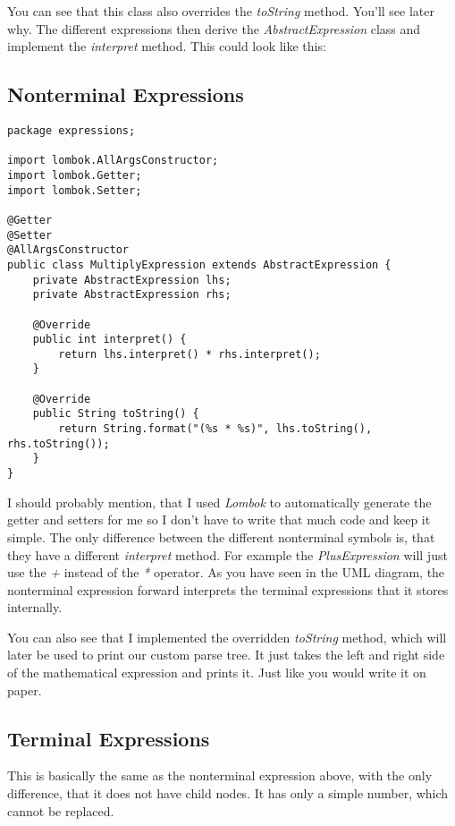 You can see that this class also overrides the \textit{toString} method. You'll see later why. The different expressions then derive the \textit{AbstractExpression} class and implement the \textit{interpret} method. This could look like this: 

\subsection{Nonterminal Expressions}

\begin{verbatim}
package expressions;

import lombok.AllArgsConstructor;
import lombok.Getter;
import lombok.Setter;

@Getter
@Setter
@AllArgsConstructor
public class MultiplyExpression extends AbstractExpression {
    private AbstractExpression lhs;
    private AbstractExpression rhs;

    @Override
    public int interpret() {
        return lhs.interpret() * rhs.interpret();
    }

    @Override
    public String toString() {
        return String.format("(%s * %s)", lhs.toString(), rhs.toString());
    }
}
\end{verbatim}

I should probably mention, that I used \textit{Lombok} to automatically generate the getter and setters for me so I don't have to write that much code and keep it simple. The only difference between the different nonterminal symbols is, that they have a different \textit{interpret} method. For example the \textit{PlusExpression} will just use the \textit{+} instead of the \textit{*} operator. As you have seen in the UML diagram, the nonterminal expression forward interprets the terminal expressions that it stores internally. 

You can also see that I implemented the overridden \textit{toString} method, which will later be used to print our custom parse tree. It just takes the left and right side of the mathematical expression and prints it. Just like you would write it on paper. 

\subsection{Terminal Expressions}

This is basically the same as the nonterminal expression above, with the only difference, that it does not have child nodes. It has only a simple number, which cannot be replaced.

